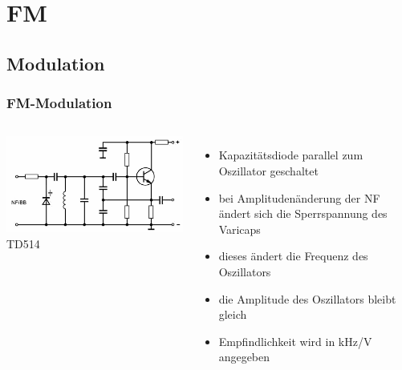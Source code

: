\section{FM}

\subsection{Modulation}

\begin{frame}
  \frametitle{FM-Modulation}

  \begin{columns}
    \includegraphics[width=\textwidth,height=.85\textheight,keepaspectratio]{a12/td514.png}\\
    {\tiny TD514}
    \begin{itemize}
      \item Kapazitätsdiode parallel zum Oszillator geschaltet
      \item bei Amplitudenänderung der NF ändert sich die Sperrspannung des Varicaps
      \item dieses ändert die Frequenz des Oszillators
      \item die Amplitude des Oszillators bleibt gleich
      \item Empfindlichkeit wird in kHz/V angegeben
    \end{itemize}
  \end{columns}
\end{frame}

